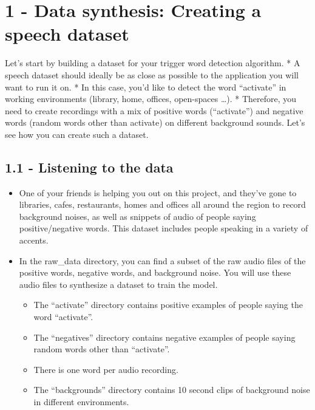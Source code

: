 \documentclass[11pt]{article}
\begin{document}
    \section{1 - Data synthesis: Creating a speech
dataset}\label{data-synthesis-creating-a-speech-dataset}

Let's start by building a dataset for your trigger word detection
algorithm. * A speech dataset should ideally be as close as possible to
the application you will want to run it on. * In this case, you'd like
to detect the word ``activate'' in working environments (library, home,
offices, open-spaces \ldots{}). * Therefore, you need to create
recordings with a mix of positive words (``activate'') and negative
words (random words other than activate) on different background sounds.
Let's see how you can create such a dataset.

\subsection{1.1 - Listening to the data}\label{listening-to-the-data}

\begin{itemize}
\itemsep1pt\parskip0pt
\item
  One of your friends is helping you out on this project, and they've
  gone to libraries, cafes, restaurants, homes and offices all around
  the region to record background noises, as well as snippets of audio
  of people saying positive/negative words. This dataset includes people
  speaking in a variety of accents.
\item
  In the raw\_data directory, you can find a subset of the raw audio
  files of the positive words, negative words, and background noise. You
  will use these audio files to synthesize a dataset to train the model.

  \begin{itemize}
  \itemsep1pt\parskip0pt
  \item
    The ``activate'' directory contains positive examples of people
    saying the word ``activate''.
  \item
    The ``negatives'' directory contains negative examples of people
    saying random words other than ``activate''.
  \item
    There is one word per audio recording.
  \item
    The ``backgrounds'' directory contains 10 second clips of background
    noise in different environments.
  \end{itemize}
\end{itemize}
\end{document}
